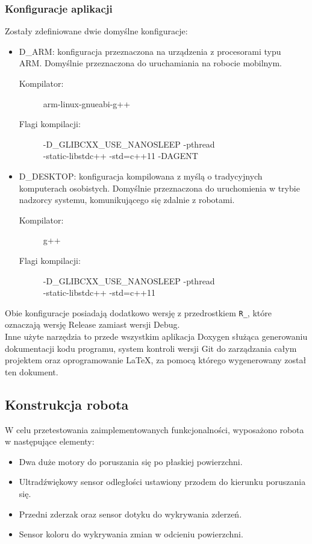 \subsubsection{Konfiguracje aplikacji}
Zostały zdefiniowane dwie domyślne konfiguracje:
\begin{itemize}
    \item D\_ARM: konfiguracja przeznaczona na urządzenia z procesorami typu\\ ARM. Domyślnie przeznaczona do uruchamiania na robocie mobilnym.
    \begin{description}
        \item[{\small Kompilator:}] {\small arm-linux-gnueabi-g++}
        \item[{\small Flagi kompilacji:}] {\small -D\_GLIBCXX\_USE\_NANOSLEEP -pthread\\ -static-libstdc++ -std=c++11 -DAGENT}
    \end{description}
    \item D\_DESKTOP: konfiguracja kompilowana z myślą o tradycyjnych komputerach osobistych. Domyślnie przeznaczona do uruchomienia w trybie nadzorcy systemu, komunikującego się zdalnie z robotami.
    \begin{description}
        \item[{\small Kompilator:}] {\small g++}
        \item[{\small Flagi kompilacji:}] {\small -D\_GLIBCXX\_USE\_NANOSLEEP -pthread\\ -static-libstdc++ -std=c++11}
    \end{description}
\end{itemize}
\noindent Obie konfiguracje posiadają dodatkowo wersję z przedrostkiem {\tt R\_}, które oznaczają wersję Release zamiast wersji Debug.\\

Inne użyte narzędzia to przede wszystkim aplikacja Doxygen służąca generowaniu dokumentacji kodu programu, system kontroli wersji Git do zarządzania całym projektem oraz oprogramowanie LaTeX, za pomocą którego wygenerowany został ten dokument.

\subsection{Konstrukcja robota}
W celu przetestowania zaimplementowanych funkcjonalności, wyposażono robota w następujące elementy:
\begin{itemize}
    \item Dwa duże motory do poruszania się po płaskiej powierzchni.
    \item Ultradźwiękowy sensor odległości ustawiony przodem do kierunku poruszania się.
    \item Przedni zderzak oraz sensor dotyku do wykrywania zderzeń.
    \item Sensor koloru do wykrywania zmian w odcieniu powierzchni.
\end{itemize}
